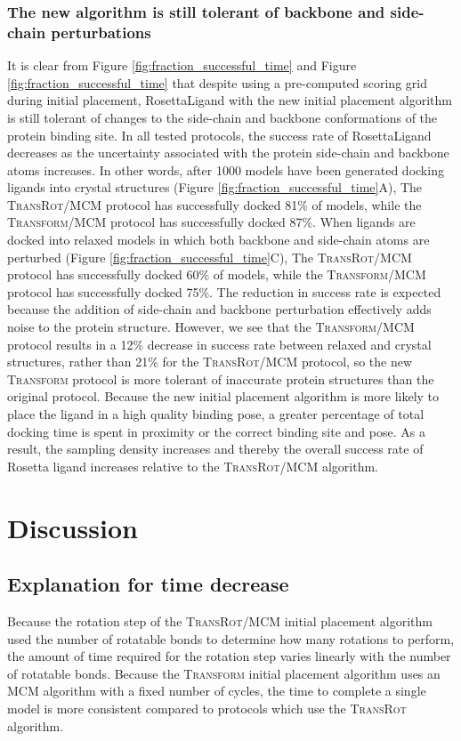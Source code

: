 \subsubsection{The new algorithm is still tolerant of backbone and side-chain perturbations}
It is clear from Figure \ref{fig:fraction_successful_time} and Figure \ref{fig:fraction_successful_time} that despite using a pre-computed scoring grid during initial placement, RosettaLigand with the new initial placement algorithm is still tolerant of changes to the side-chain and backbone conformations of the protein binding site. In all tested protocols, the success rate of RosettaLigand decreases as the uncertainty associated with the protein side-chain and backbone atoms increases.
In other words, after 1000 models have been generated docking ligands into crystal structures (Figure \ref{fig:fraction_successful_time}A), The \textsc{TransRot}/MCM protocol has successfully docked 81\% of models, while the \textsc{Transform}/MCM protocol has successfully docked 87\%.
When ligands are docked into relaxed models in which both backbone and side-chain atoms are perturbed (Figure \ref{fig:fraction_successful_time}C), The \textsc{TransRot}/MCM protocol has successfully docked 60\% of models, while the \textsc{Transform}/MCM protocol has successfully docked 75\%.
The reduction in success rate is expected because the addition of side-chain and backbone perturbation effectively adds noise to the protein structure.
However, we see that the \textsc{Transform}/MCM protocol results in a 12\% decrease in success rate between relaxed and crystal structures, rather than 21\% for the \textsc{TransRot}/MCM protocol, so the new \textsc{Transform} protocol is more tolerant of inaccurate protein structures than the original protocol.
Because the new initial placement algorithm is more likely to place the ligand in a high quality binding pose, a greater percentage of total docking time is spent in proximity or the correct binding site and pose.
As a result, the sampling density increases and thereby the overall success rate of Rosetta ligand increases relative to the \textsc{TransRot}/MCM algorithm.

\section{Discussion}

\subsection{Explanation for time decrease}
Because the rotation step of the \textsc{TransRot}/MCM initial placement algorithm used the number of rotatable bonds to determine how many rotations to perform, the amount of time required for the rotation step varies linearly with the number of rotatable bonds.
Because the \textsc{Transform} initial placement algorithm uses an MCM algorithm with a fixed number of cycles, the time to complete a single model is more consistent compared to protocols which use the \textsc{TransRot} algorithm.  

